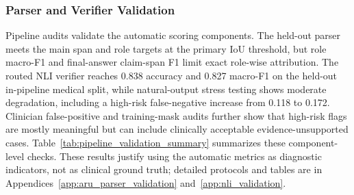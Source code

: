\documentclass[a4paper,fleqn,doubleblind]{cas-sc}
\begin{document}
\subsubsection{Parser and Verifier Validation}
\label{subsec:aru_parser_validation}
\label{subsec:verifier_validation}

Pipeline audits validate the automatic scoring components. The held-out parser meets the main span and role targets at the primary IoU threshold, but role macro-F1 and final-answer claim-span F1 limit exact role-wise attribution. The routed NLI verifier reaches 0.838 accuracy and 0.827 macro-F1 on the held-out in-pipeline medical split, while natural-output stress testing shows moderate degradation, including a high-risk false-negative increase from 0.118 to 0.172. Clinician false-positive and training-mask audits further show that high-risk flags are mostly meaningful but can include clinically acceptable evidence-unsupported cases. Table~\ref{tab:pipeline_validation_summary} summarizes these component-level checks. These results justify using the automatic metrics as diagnostic indicators, not as clinical ground truth; detailed protocols and tables are in Appendices~\ref{app:aru_parser_validation} and~\ref{app:nli_validation}.
\end{document}

